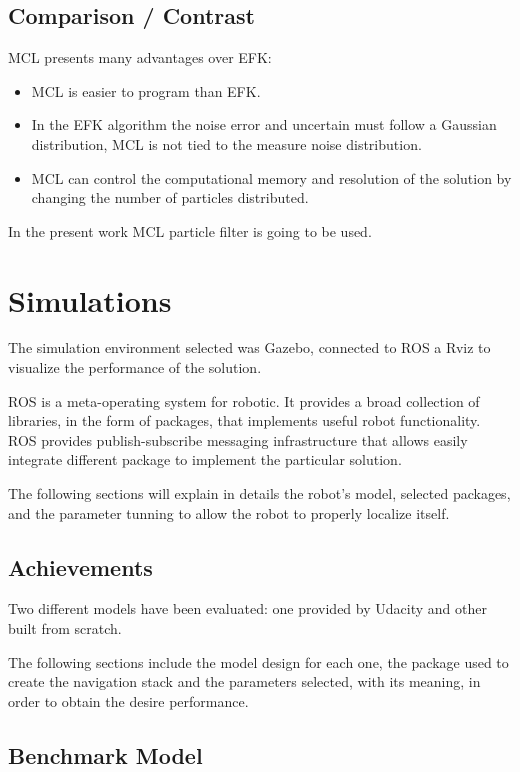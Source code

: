 \documentclass[10pt,journal,compsoc]{IEEEtran}
\begin{document}
\subsection{Comparison / Contrast}

MCL presents many advantages over EFK:

\begin{itemize}
\item MCL is easier to program than EFK. 
\item In the EFK algorithm the noise error and uncertain must follow a Gaussian distribution, MCL is not tied to the measure noise distribution.
\item MCL can control the computational memory and resolution of the solution by changing the number of particles distributed.
\end{itemize} 

In the present work MCL particle filter is going to be used.


\section{Simulations}
The simulation environment selected was Gazebo, connected to ROS a Rviz to visualize the performance of the solution. 

ROS is a meta-operating system for robotic. It provides a broad collection of libraries, in the form of packages, that implements useful robot functionality. ROS provides publish-subscribe messaging infrastructure that allows easily integrate different package to implement the particular solution.

The following sections will explain in details the robot's model, selected packages, and the parameter tunning to allow the robot to properly localize itself.

\subsection{Achievements}
Two different models have been evaluated: one provided by Udacity and other built from scratch.

The following sections include the model design for each one, the package used to create the navigation stack and the parameters selected, with its meaning, in order to obtain the desire performance.
\subsection{Benchmark Model}
\end{document}
